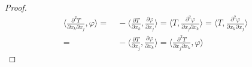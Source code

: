 \documentclass[12pt, a4paper, oneside]{ctexart}
\begin{document}
\begin{proof}
    \begin{align*}
        \langle\frac{\partial^2 T}{\partial x_k\partial x_j}, \varphi\rangle =&\ -\langle\frac{\partial T}{\partial x_k}, \frac{\partial \varphi}{\partial x_j}\rangle = \langle T, \frac{\partial^2 \varphi}{\partial x_j\partial x_k}\rangle = \langle T, \frac{\partial^2 \varphi}{\partial x_k\partial x_j}\rangle\\
        =&\ -\langle\frac{\partial T}{\partial x_j}, \frac{\partial \varphi}{\partial x_k}\rangle = \langle\frac{\partial^2 T}{\partial x_j\partial x_k},\varphi\rangle
    \end{align*}
\end{proof}
\end{document}

